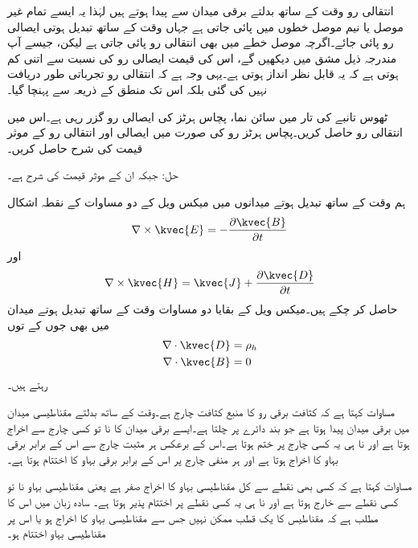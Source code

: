 انتقالی رو وقت کے ساتھ بدلتے برقی میدان سے پیدا ہوتے ہیں لہٰذا یہ ایسے تمام غیر موصل یا نیم موصل خطوں میں پائی جاتی ہے جہاں وقت کے ساتھ تبدیل ہوتی ایصالی رو پائی جائے۔اگرچہ موصل خطے میں بھی انتقالی رو پائی جاتی ہے لیکن، جیسے آپ مندرجہ ذیل مشق میں دیکھیں گے، اس کی قیمت ایصالی رو کی نسبت سے اتنی کم ہوتی ہے کہ یہ قابل نظر انداز ہوتی ہے۔یہی وجہ ہے کہ انتقالی رو تجرباتی طور دریافت نہیں کی گئی بلکہ اس تک منطق کے ذریعہ سے پہنچا گیا۔

ٹھوس تانبے کی تار میں سائن نما، پچاس ہرٹز کی ایصالی رو  گزر رہی ہے۔اس میں انتقالی رو حاصل کریں۔پچاس ہرٹز رو کی صورت میں ایصالی اور انتقالی رو کے موثر قیمت کی شرح حاصل کریں۔

حل: جبکہ ان کے موثر قیمت کی شرح   ہے۔


ہم وقت کے ساتھ تبدیل ہوتے میدانوں میں میکس ویل کے دو مساوات کے نقطہ اشکال
\begin{align}\label{مساوات-میکس_ویل_تفرقی_الف}
\nabla \times \kvec{E}=-\frac{\partial \kvec{B}}{\partial t}
\end{align}
اور
\begin{align}\label{مساوات-میکس_ویل_تفرقی_ب}
\nabla \times \kvec{H}=\kvec{J}+\frac{\partial \kvec{D}}{\partial t}
\end{align}
 حاصل کر چکے ہیں۔میکس ویل کے بقایا دو مساوات وقت کے ساتھ تبدیل ہوتے میدان میں بھی جوں کے توں
\begin{align}
\nabla \cdot \kvec{D}&=\rho_h \label{مساوات_میکس_ویل_گاوس_قانون_نقطہ}\\
\nabla \cdot \kvec{B}&=0 \label{مساوات_میکس_ویل_مقناطیسی_میدان_دو_قطب}
\end{align}
 رہتے ہیں۔ 

مساوات  کہتا ہے کہ کثافت برقی رو کا منبع کثافت چارج  ہے۔وقت کے ساتھ بدلتے مقناطیسی میدان میں برقی میدان  پیدا ہوتا ہے جو بند دائرے پر چلتا ہے۔ایسے برقی میدان کا نا تو کسی چارج سے اخراج ہوتا ہے اور نا ہی یہ کسی چارج پر ختم ہوتا ہے۔اس کے برعکس ہر مثبت چارج سے اس کے برابر برقی بہاو کا اخراج ہوتا ہے اور ہر منفی چارج پر اس کے برابر برقی بہاو کا اختتام ہوتا ہے۔
  

مساوات  کہتا ہے کہ کسی بھی نقطے سے کل مقناطیسی بہاو کا اخراج صفر ہے یعنی مقناطیسی بہاو نا تو کسی نقطے سے خارج ہوتا ہے اور نا ہی یہ کسی نقطے پر اختتام پذیر ہوتا ہے۔ سادہ زبان میں اس کا مطلب ہے کہ مقناطیس کا یک قطب ممکن نہیں جس سے مقناطیسی بہاو کا اخراج ہو یا اس پر مقناطیسی بہاو اختتام ہو۔

